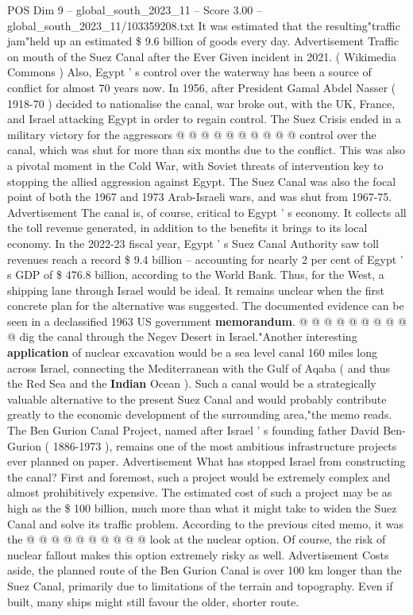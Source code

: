 \begin{textsample}{POS Dim 9 – global\_south\_2023\_11 – Score 3.00 – global\_south\_2023\_11/103359208.txt}
It was estimated that the resulting"traffic jam"held up an estimated \$ 9.6 billion of goods every day.
Advertisement Traffic on mouth of the Suez Canal after the Ever Given incident in 2021. ( Wikimedia Commons ) Also, Egypt ' s control over the waterway has been a source of conflict for almost 70 years now.
In 1956, after President Gamal Abdel Nasser ( 1918-70 ) decided to nationalise the canal, war broke out, with the UK, France, and Israel attacking Egypt in order to regain control.
The Suez Crisis ended in a military victory for the aggressors @ @ @ @ @ @ @ @ @ @ control over the canal, which was shut for more than six months due to the conflict.
This was also a pivotal moment in the Cold War, with Soviet threats of intervention key to stopping the allied aggression against Egypt.
The Suez Canal was also the focal point of both the 1967 and 1973 Arab-Israeli wars, and was shut from 1967-75.
Advertisement The canal is, of course, critical to Egypt ' s economy.
It collects all the toll revenue generated, in addition to the benefits it brings to its local economy.
In the 2022-23 fiscal year, Egypt ' s Suez Canal Authority saw toll revenues reach a record \$ 9.4 billion -- accounting for nearly 2 per cent of Egypt ' s GDP of \$ 476.8 billion, according to the World Bank.
Thus, for the West, a shipping lane through Israel would be ideal.
It remains unclear when the first concrete plan for the alternative was suggested.
The documented evidence can be seen in a declassified 1963 US government \textbf{memorandum}. @ @ @ @ @ @ @ @ @ @ dig the canal through the Negev Desert in Israel."Another interesting \textbf{application} of nuclear excavation would be a sea level canal 160 miles long across Israel, connecting the Mediterranean with the Gulf of Aqaba ( and thus the Red Sea and the \textbf{Indian} Ocean ).
Such a canal would be a strategically valuable alternative to the present Suez Canal and would probably contribute greatly to the economic development of the surrounding area,"the memo reads.
The Ben Gurion Canal Project, named after Israel ' s founding father David Ben-Gurion ( 1886-1973 ), remains one of the most ambitious infrastructure projects ever planned on paper.
Advertisement What has stopped Israel from constructing the canal?
First and foremost, such a project would be extremely complex and almost prohibitively expensive.
The estimated cost of such a project may be as high as the \$ 100 billion, much more than what it might take to widen the Suez Canal and solve its traffic problem.
According to the previous cited memo, it was the @ @ @ @ @ @ @ @ @ @ look at the nuclear option.
Of course, the risk of nuclear fallout makes this option extremely risky as well.
Advertisement Costs aside, the planned route of the Ben Gurion Canal is over 100 km longer than the Suez Canal, primarily due to limitations of the terrain and topography.
Even if built, many ships might still favour the older, shorter route.

\end{textsample}
